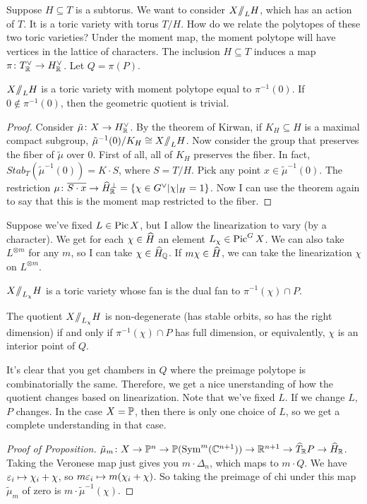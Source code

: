 Suppose $H\subseteq T$ is a subtorus. We want to consider $X\mbox{\rm /\!\!/}_L H$, which has an action of $T$. It is a toric variety with torus $T/H$. How do we relate the polytopes of these two toric varieties? Under the moment map, the moment polytope will have vertices in the lattice of characters. The inclusion $H\subseteq T$ induces a map $\pi\colon T^\vee_{\mathbb{R}}\to H^\vee_{\mathbb{R}}$. Let $Q=\pi(P)$.
\begin{proposition}
 $X\mbox{\rm /\!\!/}_L H$ is a toric variety with moment polytope equal to $\pi^{-1}(0)$. If $0\not\in \pi^{-1}(0)$, then the geometric quotient is trivial.
\end{proposition}
\begin{proof}
 Consider $\tilde\mu\colon X\to H^\vee_{\mathbb{R}}$. By the theorem of Kirwan, if $K_H\subseteq H$ is a maximal compact subgroup, $\tilde\mu^{-1}(0)/K_H\cong X\mbox{\rm /\!\!/}_L H$. Now consider the group that preserves the fiber of $\tilde\mu$ over $0$. First of all, all of $K_H$ preserves the fiber. In fact, $Stab_T(\tilde\mu^{-1}(0))=K\cdot S$, where $S=T/H$. Pick any point $x\in \tilde\mu^{-1}(0)$. The restriction $\mu\colon \overline{S\cdot x}\to \widehat{H}_{\mathbb{R}}^\perp = \{\chi\in G^\vee|\chi|_H=1\}$. Now I can use the theorem again to say that this is the moment map restricted to the fiber.
\end{proof}
Suppose we've fixed $L\in \operatorname{Pic} X$, but I allow the linearization to vary (by a character). We get for each $\chi\in \widehat{H}$ an element $L_\chi\in \operatorname{Pic}^G X$. We can also take $L^{\otimes m}$ for any $m$, so I can take $\chi\in \widehat{H}_{\mathbb{Q}}$. If $m\chi\in \widehat{H}$, we can take the linearization $\chi$ on $L^{\otimes m}$. 
\begin{proposition}
 $X\mbox{\rm /\!\!/}_{L_\chi}H$ is a toric variety whose fan is the dual fan to $\pi^{-1}(\chi)\cap P$.
\end{proposition}
\begin{corollary}
 The quotient $X\mbox{\rm /\!\!/}_{L_\chi}H$ is non-degenerate (has stable orbits, so has the right dimension) if and only if $\pi^{-1}(\chi)\cap P$ has full dimension, or equivalently, $\chi$ is an interior point of $Q$.
\end{corollary}
It's clear that you get chambers in $Q$ where the preimage polytope is combinatorially the same. Therefore, we get a nice unerstanding of how the quotient changes based on linearization. Note that we've fixed $L$. If we change $L$, $P$ changes. In the case $X=\mathbb{P}$, then there is only one choice of $L$, so we get a complete understanding in that case.
\begin{proof}[Proof of Proposition]
 $\tilde\mu_m\colon X\to \mathbb{P}^n\to \mathbb{P}(\operatorname{Sym}^m(\mathbb{C}^{n+1}))\to \mathbb{R}^{n+1}\to \widehat{T}_{\mathbb{R}} P\to \widehat{H}_{\mathbb{R}}$. Taking the Veronese map just gives you $m\cdot \Delta_n$, which maps to $m\cdot Q$. We have $\varepsilon_i\mapsto \chi_i+\chi$, so $m\varepsilon_i\mapsto m(\chi_i+\chi)$. So taking the preimage of chi under this map $\tilde\mu_m$ of zero is $m\cdot \tilde\mu^{-1}(\chi)$.
\end{proof}

